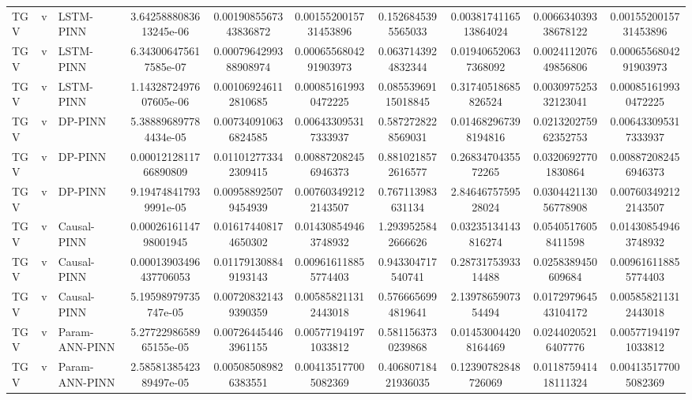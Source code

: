 \begin{landscape}
\begin{longtable}{lllccccccc}
 TGV &     v &      LSTM-PINN & 3.6425888083613245e-06 &  0.0019085567343836872 &  0.0015520015731453896 &   0.1526845395565033 & 0.0038174116513864024 &  0.006634039338678122 &  0.0015520015731453896 \\
 TGV &     v &      LSTM-PINN &  6.343006475617585e-07 &  0.0007964299388908974 &  0.0006556804291903973 &   0.0637143924832344 &  0.019406520637368092 &  0.002411207649856806 &  0.0006556804291903973 \\
 TGV &     v &      LSTM-PINN & 1.1432872497607605e-06 &   0.001069246112810685 &   0.000851619930472225 &  0.08553969115018845 &   0.31740518685826524 &  0.003097525332123041 &   0.000851619930472225 \\
 TGV &     v &        DP-PINN &  5.388896897784434e-05 &   0.007340910636824585 &   0.006433095317333937 &   0.5872728228569031 &  0.014682967398194816 &  0.021320275962352753 &   0.006433095317333937 \\
 TGV &     v &        DP-PINN &  0.0001212811766890809 &   0.011012773342309415 &   0.008872082456946373 &   0.8810218572616577 &    0.2683470435572265 &   0.03206927701830864 &   0.008872082456946373 \\
 TGV &     v &        DP-PINN &  9.194748417939991e-05 &   0.009588925079454939 &   0.007603492122143507 &    0.767113983631134 &    2.8464675759528024 &  0.030442113056778908 &   0.007603492122143507 \\
 TGV &     v &    Causal-PINN &  0.0002616114798001945 &   0.016174408174650302 &   0.014308549463748932 &   1.2939525842666626 &   0.03235134143816274 &   0.05405176058411598 &   0.014308549463748932 \\
 TGV &     v &    Causal-PINN & 0.00013903496437706053 &   0.011791308849193143 &   0.009616118855774403 &    0.943304717540741 &    0.2873175393314488 &    0.0258389450609684 &   0.009616118855774403 \\
 TGV &     v &    Causal-PINN &   5.19598979735747e-05 &   0.007208321439390359 &   0.005858211312443018 &   0.5766656994819641 &    2.1397865907354494 &  0.017297964543104172 &   0.005858211312443018 \\
 TGV &     v & Param-ANN-PINN & 5.2772298658965155e-05 &   0.007264454463961155 &   0.005771941971033812 &   0.5811563730239868 &  0.014530044208164469 &   0.02440205216407776 &   0.005771941971033812 \\
 TGV &     v & Param-ANN-PINN & 2.5858138542389497e-05 &   0.005085089826383551 &   0.004135177005082369 &  0.40680718421936035 &   0.12390782848726069 &  0.011875941418111324 &   0.004135177005082369 \\

\end{longtable}
\end{landscape}
